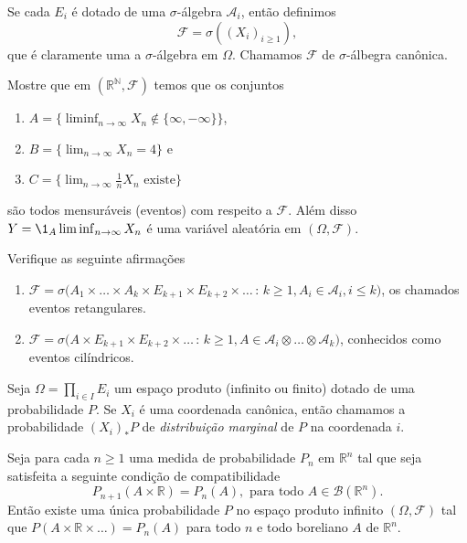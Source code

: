 Se cada $E_i$ é dotado de uma $\sigma$-álgebra $\mathcal{A}_i$, então definimos
\begin{equation}
  \mathcal{F} = \sigma( (X_i)_{i\geq 1} ),
\end{equation}
que é claramente uma a $\sigma$-álgebra em $\Omega$.
Chamamos $\mathcal{F}$ de $\sigma$-álbegra canônica.

\begin{exercise}
  Mostre que em $(\mathbb{R}^{\mathbb{N}},\mathcal{F})$ temos que os conjuntos
  \begin{enumerate}[\quad a)]
  \item $A = \{ \liminf_{n\to \infty} X_n \notin \{\infty,-\infty\} \}$,
  \item $B = \{ \lim_{n\to \infty} X_n = 4\}$ e
  \item $C = \{ \lim_{n\to \infty} \tfrac{1}{n} X_n \text{ existe}\}$
  \end{enumerate}
  são todos mensuráveis (eventos) com respeito a $\mathcal{F}$.
  Além disso $Y = \1_A \liminf_{n\to \infty} X_n$ é uma variável aleatória em $(\Omega, \mathcal{F})$.
\end{exercise}

\begin{exercise}
  Verifique as seguinte afirmações
  \begin{enumerate}[\quad a)]
  \item $\mathcal{F} = \sigma\big(A_1 \times \dots \times A_k \times E_{k+1} \times E_{k+2} \times \dots\, : \, k \geq 1, A_i \in \mathcal{A}_i, i \leq k\big)$,
  os chamados eventos retangulares.
  \item $\mathcal{F} = \sigma\big(A \times E_{k+1} \times E_{k+2} \times \dots\, : \, k \geq 1, A \in \mathcal{A}_i \otimes \dots \otimes \mathcal{A}_k\big)$,
  conhecidos como eventos cilíndricos.
  \end{enumerate}
\end{exercise}

\begin{definition}
  \label{d:marginal}
  Seja $\Omega = \prod_{i\in I} E_i$ um espaço produto (infinito ou finito) dotado de uma probabilidade $P$.
  Se $X_i$ é uma coordenada canônica, então chamamos a probabilidade $(X_i)_*  P$ de \emph{distribuição marginal}  de $P$ na coordenada $i$.
\end{definition}

\begin{theorem}
  \label{t:extens_kolmog}
  Seja para cada $n \geq 1$ uma medida de probabilidade $P_n$ em $\mathbb{R}^n$ tal que seja satisfeita a seguinte condição de compatibilidade 
  \begin{equation}
    \label{e:consist_kolmog}
    P_{n+1} (A \times \mathbb{R}) = P_n (A), \text{ para todo $A \in \mathcal{B}(\mathbb{R}^n)$}.
  \end{equation}
  Então existe uma única probabilidade $P$ no espaço produto infinito $(\Omega, \mathcal{F})$ tal que $P(A \times \mathbb{R} \times \dots) = P_n (A)$ para todo $n$ e todo boreliano $A$ de $\mathbb{R}^n$.
\end{theorem}

